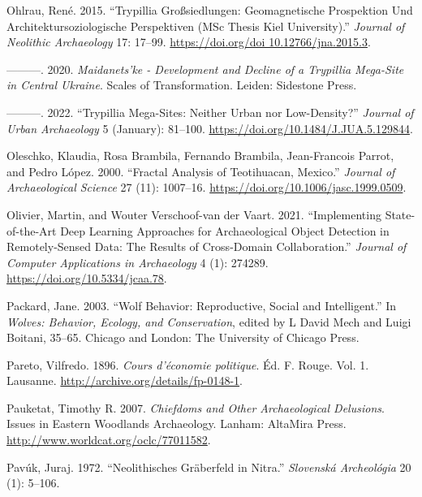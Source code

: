 \documentclass[
  12pt,
  a4paper, twoside]{book}
\newlength{\cslhangindent}
\newlength{\cslentryspacingunit} %
\newenvironment{CSLReferences}[2] %
 {%
  \setlength{\parindent}{0pt}
  \ifodd #1
  \let\oldpar\par
  \def\par{\hangindent=\cslhangindent\oldpar}
  \fi
  \setlength{\parskip}{#2\cslentryspacingunit}
 }%
 {}
\begin{document}
\begin{CSLReferences}{1}{0}
\leavevmode{}%
Ohlrau, René. 2015. {``Trypillia Großsiedlungen: Geomagnetische Prospektion Und Architektursoziologische Perspektiven (MSc Thesis Kiel University).''} \emph{Journal of Neolithic Archaeology} 17: 17--99. \href{https://doi.org/doi\%2010.12766/jna.2015.3}{https://doi.org/doi 10.12766/jna.2015.3}.

\leavevmode{}%
---------. 2020. \emph{Maidanets'ke - Development and Decline of a Trypillia Mega-Site in Central Ukraine}. Scales of Transformation. Leiden: Sidestone Press.

\leavevmode{}%
---------. 2022. {``Trypillia Mega-Sites: Neither Urban nor Low-Density?''} \emph{Journal of Urban Archaeology} 5 (January): 81--100. \url{https://doi.org/10.1484/J.JUA.5.129844}.

\leavevmode{}%
Oleschko, Klaudia, Rosa Brambila, Fernando Brambila, Jean-Francois Parrot, and Pedro López. 2000. {``Fractal Analysis of Teotihuacan, Mexico.''} \emph{Journal of Archaeological Science} 27 (11): 1007--16. \url{https://doi.org/10.1006/jasc.1999.0509}.

\leavevmode{}%
Olivier, Martin, and Wouter Verschoof-van der Vaart. 2021. {``Implementing State-of-the-Art Deep Learning Approaches for Archaeological Object Detection in Remotely-Sensed Data: The Results of Cross-Domain Collaboration.''} \emph{Journal of Computer Applications in Archaeology} 4 (1): 274289. \url{https://doi.org/10.5334/jcaa.78}.

\leavevmode{}%
Packard, Jane. 2003. {``Wolf Behavior: Reproductive, Social and Intelligent.''} In \emph{Wolves: Behavior, Ecology, and Conservation}, edited by L David Mech and Luigi Boitani, 35--65. {Chicago and London}: {The University of Chicago Press}.

\leavevmode{}%
Pareto, Vilfredo. 1896. \emph{Cours d'économie politique}. Éd. F. Rouge. Vol. 1. Lausanne. \url{http://archive.org/details/fp-0148-1}.

\leavevmode{}%
Pauketat, Timothy R. 2007. \emph{Chiefdoms and Other Archaeological Delusions}. Issues in Eastern Woodlands Archaeology. Lanham: AltaMira Press. \url{http://www.worldcat.org/oclc/77011582}.

\leavevmode{}%
Pavúk, Juraj. 1972. {``Neolithisches Gräberfeld in Nitra.''} \emph{Slovenská Archeológia} 20 (1): 5--106.


\end{CSLReferences}
\end{document}
